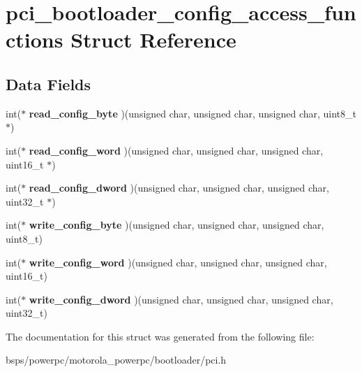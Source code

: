 \hypertarget{structpci__bootloader__config__access__functions}{}\section{pci\+\_\+bootloader\+\_\+config\+\_\+access\+\_\+functions Struct Reference}
\label{structpci__bootloader__config__access__functions}
\subsection*{Data Fields}
\begin{DoxyCompactItemize}
\item 
\mbox{\label{structpci__bootloader__config__access__functions_adc5f3cca1f2a0c99b87f715f221ce787}} 
int($\ast$ {\bfseries read\+\_\+config\+\_\+byte} )(unsigned char, unsigned char, unsigned char, uint8\+\_\+t $\ast$)
\item 
\mbox{\label{structpci__bootloader__config__access__functions_a12017c569e359318944eed5e0c464bf4}} 
int($\ast$ {\bfseries read\+\_\+config\+\_\+word} )(unsigned char, unsigned char, unsigned char, uint16\+\_\+t $\ast$)
\item 
\mbox{\label{structpci__bootloader__config__access__functions_a52a2534cdcdf5c9245ea1c958424811d}} 
int($\ast$ {\bfseries read\+\_\+config\+\_\+dword} )(unsigned char, unsigned char, unsigned char, uint32\+\_\+t $\ast$)
\item 
\mbox{\label{structpci__bootloader__config__access__functions_a045350c3c74f354c574fc686a9b351a5}} 
int($\ast$ {\bfseries write\+\_\+config\+\_\+byte} )(unsigned char, unsigned char, unsigned char, uint8\+\_\+t)
\item 
\mbox{\label{structpci__bootloader__config__access__functions_ad21ebe6181ce204cd6a3d8ced4615479}} 
int($\ast$ {\bfseries write\+\_\+config\+\_\+word} )(unsigned char, unsigned char, unsigned char, uint16\+\_\+t)
\item 
\mbox{\label{structpci__bootloader__config__access__functions_a75642cd22e62a5a35575f2412703e311}} 
int($\ast$ {\bfseries write\+\_\+config\+\_\+dword} )(unsigned char, unsigned char, unsigned char, uint32\+\_\+t)
\end{DoxyCompactItemize}


The documentation for this struct was generated from the following file\+:\begin{DoxyCompactItemize}
\item 
bsps/powerpc/motorola\+\_\+powerpc/bootloader/pci.\+h\end{DoxyCompactItemize}
